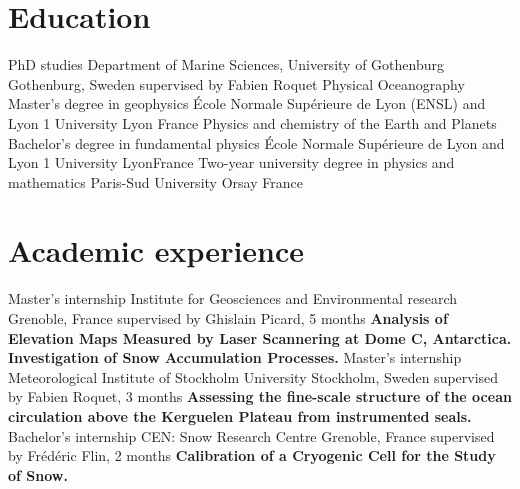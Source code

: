 \documentclass[11pt,a4paper,roman]{moderncv}
\begin{document}
\makecvtitle


\section{Education}
        {PhD studies}
        {Department of Marine Sciences, University of Gothenburg}
        {Gothenburg, Sweden}
        {supervised by Fabien Roquet}
        {Physical Oceanography}
        {Master's degree in geophysics}
        {École Normale Supérieure de Lyon (ENSL) and Lyon 1 University}
        {Lyon}
        {France}
        {Physics and chemistry of the Earth and Planets}
        {Bachelor's degree in fundamental physics}
        {École Normale Supérieure de Lyon and Lyon 1 University}
        {Lyon}{France}{}
        {Two-year university degree in physics and mathematics}
        {Paris-Sud University}
        {Orsay}
        {France}
        {}


\section{Academic experience}
        {Master's internship}
        {Institute for Geosciences and Environmental research}
        {Grenoble, France}
        {supervised by Ghislain Picard, 5 months}
        {\textbf{Analysis of Elevation Maps Measured by Laser Scannering at
            Dome C, Antarctica. Investigation of Snow Accumulation Processes.}}
        {Master's internship}
        {Meteorological Institute of Stockholm University}
        {Stockholm, Sweden}
        {supervised by Fabien Roquet, 3 months}
        {\textbf{Assessing the fine-scale structure of the ocean
            circulation above the Kerguelen Plateau from instrumented seals.}}
        {Bachelor's internship}
        {CEN: Snow Research Centre}
        {Grenoble, France}
        {supervised by Frédéric Flin, 2 months}
        {\textbf{Calibration of a Cryogenic Cell for the Study of Snow.}}

        
\end{document}
